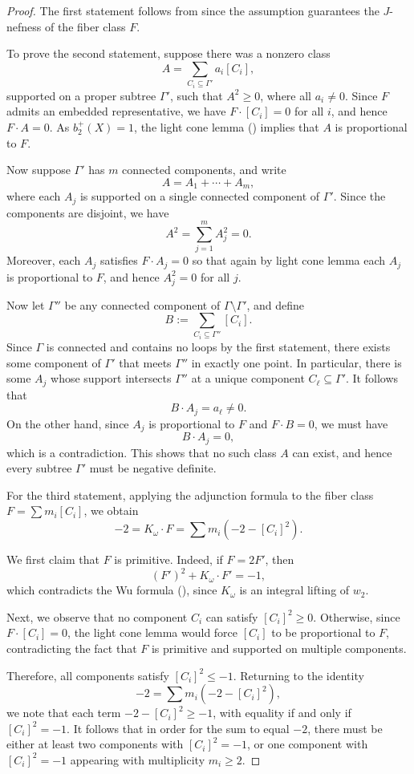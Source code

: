 \documentclass[11pt]{article}
\theoremstyle{definition}
\theoremstyle{remark}
\begin{document}
\begin{proof}
  The first statement follows from \cite[Theorem 1.5]{Jnef} since the assumption guarantees the $J$-nefness of the fiber class $F$. 

  To prove the second statement, suppose there was a nonzero class
\[
A=\sum_{C_i\subseteq \Gamma'} a_i [C_i],
\]
supported on a proper subtree $\Gamma'$, such that $A^2\ge 0$, where all $a_i\neq 0$. Since $F$ admits an embedded representative, we have $F\cdot [C_i]=0$ for all $i$, and hence $F\cdot A=0$. As $b_2^+(X)=1$, the light cone lemma (\cite[Lemma 3.7]{McDufflectures}) implies that $A$ is proportional to $F$.

Now suppose $\Gamma'$ has $m$ connected components, and write
\[
A=A_1+\cdots +A_m,
\]
where each $A_j$ is supported on a single connected component of $\Gamma'$. Since the components are disjoint, we have
\[
A^2=\sum_{j=1}^m A_j^2=0.
\]
Moreover, each $A_j$ satisfies $F\cdot A_j=0$ so that again by light cone lemma each $A_j$ is proportional to $F$, and hence $A_j^2=0$ for all $j$.

Now let $\Gamma''$ be any connected component of $\Gamma\setminus \Gamma'$, and define
\[
B:=\sum_{C_i\subseteq \Gamma''} [C_i].
\]
Since $\Gamma$ is connected and contains no loops by the first statement, there exists some component of $\Gamma'$ that meets $\Gamma''$ in exactly one point. In particular, there is some $A_j$ whose support intersects $\Gamma''$ at a unique component $C_\ell\subseteq \Gamma'$. It follows that
\[
B\cdot A_j = a_\ell \neq 0.
\]
On the other hand, since $A_j$ is proportional to $F$ and $F\cdot B=0$, we must have
\[
B\cdot A_j=0,
\]
which is a contradiction. This shows that no such class $A$ can exist, and hence every subtree $\Gamma'$ must be negative definite.

For the third statement, applying the adjunction formula to the fiber class $F=\sum m_i[C_i]$, we obtain
\[
-2 = K_\omega \cdot F = \sum m_i(-2 - [C_i]^2).
\]

We first claim that $F$ is primitive. Indeed, if $F=2F'$, then
\[
(F')^2 + K_\omega \cdot F' = -1,
\]
which contradicts the Wu formula (\cite[Proposition 1.4.18]{GSbook}), since $K_\omega$ is an integral lifting of $w_2$.

Next, we observe that no component $C_i$ can satisfy $[C_i]^2 \ge 0$. Otherwise, since $F\cdot [C_i]=0$, the light cone lemma would force $[C_i]$ to be proportional to $F$, contradicting the fact that $F$ is primitive and supported on multiple components.

Therefore, all components satisfy $[C_i]^2 \le -1$. Returning to the identity
\[
-2 = \sum m_i(-2 - [C_i]^2),
\]
we note that each term $-2 - [C_i]^2 \ge -1$, with equality if and only if $[C_i]^2=-1$. It follows that in order for the sum to equal $-2$, there must be either at least two components with $[C_i]^2=-1$, or one component with $[C_i]^2=-1$ appearing with multiplicity $m_i \ge 2$.
\end{proof}
\end{document}
